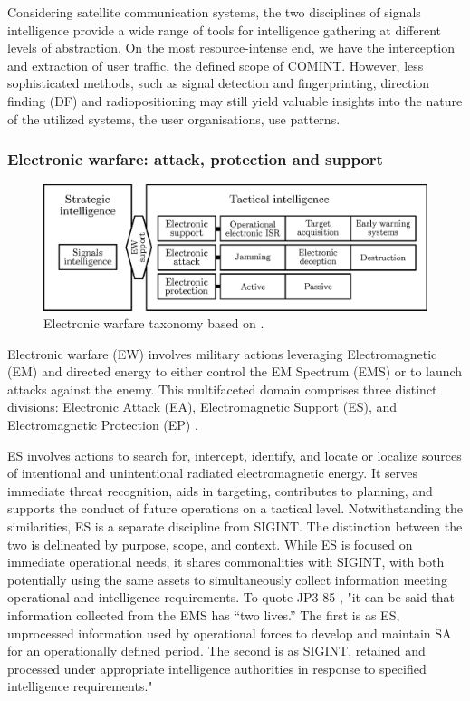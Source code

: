 \documentclass[english, 12pt, a4paper, elec, utf8, a-1b, online]{aaltothesis}
\begin{document}
Considering satellite communication systems, the two disciplines of signals intelligence provide a wide range of tools for intelligence gathering at different levels of abstraction.
On the most resource-intense end, we have the interception and extraction of user traffic, the defined scope of COMINT.
However, less sophisticated methods, such as signal detection and fingerprinting, direction finding (DF) and radiopositioning may still yield valuable insights into the nature of the utilized systems, the user organisations, use patterns.

\subsubsection{Electronic warfare: attack, protection and support}

\begin{figure}[h]
  \centering
  \includegraphics[width=145mm]{figures/fig-electronic-warfare.eps}
  \caption{Electronic warfare taxonomy based on \cite{kosola2013digitaalinen}.}
  \label{fig-electronic-warfare}
\end{figure}

Electronic warfare (EW) involves military actions leveraging Electromagnetic (EM) and directed energy to either control the EM Spectrum (EMS) or to launch attacks against the enemy. This multifaceted domain comprises three distinct divisions: Electronic Attack (EA), Electromagnetic Support (ES), and Electromagnetic Protection (EP) \cite{jp3-85,kosola2013digitaalinen}.

ES involves actions to search for, intercept, identify, and locate or localize sources of intentional and unintentional radiated electromagnetic energy. It serves immediate threat recognition, aids in targeting, contributes to planning, and supports the conduct of future operations on a tactical level. Notwithstanding the similarities, ES is a separate discipline from SIGINT. The distinction between the two is delineated by purpose, scope, and context. While ES is focused on immediate operational needs, it shares commonalities with SIGINT, with both potentially using the same assets to simultaneously collect information meeting operational and intelligence requirements.
To quote JP3-85 \cite{jp3-85}, "it can be said that information collected from the EMS has “two lives.”
The first is as ES, unprocessed information used by operational forces to develop and maintain SA for an operationally defined period.
The second is as SIGINT, retained and processed under appropriate intelligence authorities in response to specified intelligence requirements." %
\end{document}
